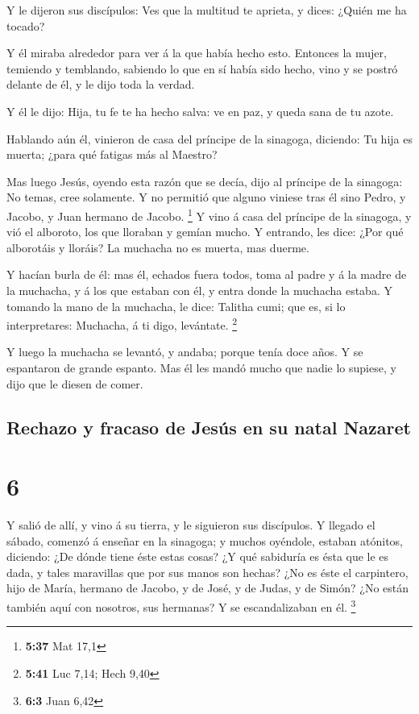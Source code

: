  Y le dijeron sus discípulos: Ves que la multitud te
aprieta, y dices: ¿Quién me ha tocado?

 Y él miraba alrededor para ver á la que había hecho esto.
 Entonces la mujer, temiendo y temblando, sabiendo lo que
en sí había sido hecho, vino y se postró delante de él, y le dijo toda
la verdad.

 Y él le dijo: Hija, tu fe te ha hecho salva: ve en paz, y
queda sana de tu azote.

 Hablando aún él, vinieron de casa del príncipe de la
sinagoga, diciendo: Tu hija es muerta; ¿para qué fatigas más al Maestro?

 Mas luego Jesús, oyendo esta razón que se decía, dijo al
príncipe de la sinagoga: No temas, cree solamente.  Y no
permitió que alguno viniese tras él sino Pedro, y Jacobo, y Juan hermano
de Jacobo. \footnote{\textbf{5:37} Mat 17,1}  Y vino á casa
del príncipe de la sinagoga, y vió el alboroto, los que lloraban y
gemían mucho.  Y entrando, les dice: ¿Por qué alborotáis y
lloráis? La muchacha no es muerta, mas duerme.

 Y hacían burla de él: mas él, echados fuera todos, toma al
padre y á la madre de la muchacha, y á los que estaban con él, y entra
donde la muchacha estaba.  Y tomando la mano de la
muchacha, le dice: Talitha cumi; que es, si lo interpretares: Muchacha,
á ti digo, levántate. \footnote{\textbf{5:41} Luc 7,14; Hech 9,40}

 Y luego la muchacha se levantó, y andaba; porque tenía
doce años. Y se espantaron de grande espanto.  Mas él les
mandó mucho que nadie lo supiese, y dijo que le diesen de comer.

\hypertarget{rechazo-y-fracaso-de-jesuxfas-en-su-natal-nazaret}{%
\subsection{Rechazo y fracaso de Jesús en su natal
Nazaret}\label{rechazo-y-fracaso-de-jesuxfas-en-su-natal-nazaret}}

\hypertarget{section-5}{%
\section{6}\label{section-5}}

 Y salió de allí, y vino á su tierra, y le siguieron sus
discípulos.  Y llegado el sábado, comenzó á enseñar en la
sinagoga; y muchos oyéndole, estaban atónitos, diciendo: ¿De dónde tiene
éste estas cosas? ¿Y qué sabiduría es ésta que le es dada, y tales
maravillas que por sus manos son hechas?  ¿No es éste el
carpintero, hijo de María, hermano de Jacobo, y de José, y de Judas, y
de Simón? ¿No están también aquí con nosotros, sus hermanas? Y se
escandalizaban en él. \footnote{\textbf{6:3} Juan 6,42}

